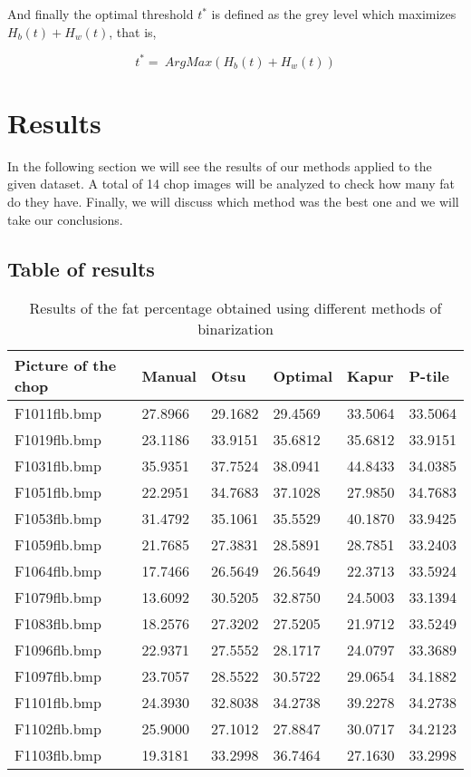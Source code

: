 \documentclass[12]{article}
\begin{document}
And finally the optimal threshold $t^{*}$ is defined as the grey level which maximizes $H_b(t)+H_w(t)$, that is, 
\vspace{-0.5cm}
\begin{center}
$$t^{*}=\ ArgMax\left(H_b(t) + H_w(t)\right)$$
\end{center}
\section{Results}
In the following section we will see the results of our methods applied to the given dataset. A total of 14 chop images will be analyzed to check how many fat do they have.  
Finally, we will discuss which method was the best one and we will take our conclusions. %
\subsection{Table of results}

\begin{table}[H]
\centering
\begin{tabular}{|l|l|l|l|l|l|}
\hline	Picture of the chop & \textbf{Manual} & \textbf{Otsu} & \textbf{Optimal} & \textbf{Kapur} & \textbf{P-tile} \\  \hline
F1011flb.bmp &  27.8966	&  29.1682	&  29.4569	&  33.5064	&  33.5064\\ \hline
F1019flb.bmp &  23.1186	&  33.9151	&  35.6812	&  35.6812	&  33.9151\\ \hline
F1031flb.bmp &  35.9351	&  37.7524	&  38.0941	&  44.8433	&  34.0385\\ \hline
F1051flb.bmp &  22.2951	&  34.7683	&  37.1028	&  27.9850	&  34.7683\\ \hline
F1053flb.bmp &  31.4792	&  35.1061	&  35.5529	&  40.1870	&  33.9425\\ \hline
F1059flb.bmp &  21.7685	&  27.3831	&  28.5891	&  28.7851	&  33.2403\\ \hline
F1064flb.bmp &  17.7466	&  26.5649	&  26.5649	&  22.3713	&  33.5924\\ \hline
F1079flb.bmp &  13.6092	&  30.5205	&  32.8750	&  24.5003	&  33.1394\\ \hline
F1083flb.bmp &  18.2576	&  27.3202	&  27.5205	&  21.9712	&  33.5249\\ \hline
F1096flb.bmp &  22.9371	&  27.5552	&  28.1717	&  24.0797	&  33.3689\\ \hline
F1097flb.bmp &  23.7057	&  28.5522	&  30.5722	&  29.0654	&  34.1882\\ \hline
F1101flb.bmp &  24.3930	&  32.8038	&  34.2738	&  39.2278	&  34.2738\\ \hline
F1102flb.bmp &  25.9000	&  27.1012	&  27.8847	&  30.0717	&  34.2123\\ \hline
F1103flb.bmp &  19.3181	&  33.2998	&  36.7464	&  27.1630	&  33.2998\\ \hline
\end{tabular}
\caption{Results of the fat percentage obtained using different methods of binarization}
\label{Results}
\end{table}
\end{document}
